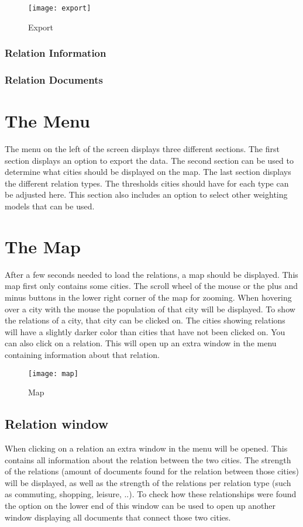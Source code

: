 \begin{figure}[H]
    \centering
    \texttt{[image: export]}
    \caption{Export}
    \label{fig:infoflow}
\end{figure}

\subsubsection{Relation Information}\label{sec:rel-info}
\subsubsection{Relation Documents}


\section{The Menu}
The menu on the left of the screen displays three different sections. The first section displays an option to export the data. The second section can be used to determine what cities should be displayed on the map. The last section displays the different relation types. The thresholds cities should have for each type can be adjusted here. This section also includes an option to select other weighting models that can be used.


\section{The Map}
After a few seconds needed to load the relations, a map should be displayed. This map first only contains some cities. The scroll wheel of the mouse or the plus and minus buttons in the lower right corner of the map for zooming. When hovering over a city with the mouse the population of that city will be displayed. To show the relations of a city, that city can be clicked on. The cities showing relations will have a slightly darker color than cities that have not been clicked on. You can also click on a relation. This will open up an extra window in the menu containing information about that relation.

\begin{figure}[H]
    \centering
    \texttt{[image: map]}
    \caption{Map}
    \label{fig:infoflow}
\end{figure}





\subsection{Relation window}
When clicking on a relation an extra window in the menu will be opened. This contains all information about the relation between the two cities. The strength of the relations (amount of documents found for the relation between those cities) will be displayed, as well as the strength of the relations per relation type (such as commuting, shopping, leisure, ..). To check how these relationships were found the option on the lower end of this window  can be used to open up another window displaying all documents that connect those two cities.

